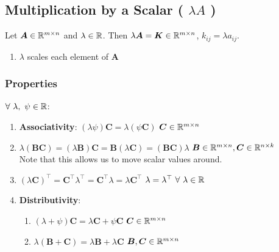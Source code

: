 \subsection{Multiplication by a Scalar ( $\lambda A$ )}

Let $\bm{A} \in \mathbb{R}^{m\times n}$ and $\lambda \in \mathbb{R}$. 
Then $\lambda \bm{A} = \bm{K} \in \mathbb{R}^{m\times n}$, $k_{ij} = \lambda a_{ij}$.
\hfill \cite{mfml/book/mml/Deisenroth-Faisal-Ong}


\begin{enumerate}
    \item $\lambda$ scales each element of $\bm{A}$
    \hfill \cite{mfml/book/mml/Deisenroth-Faisal-Ong}    
\end{enumerate}





\subsubsection{Properties}

$\forall\ \lambda,\ \psi \in \mathbb{R}$:
\vspace{0.2cm}
\begin{enumerate}
    \item \textbf{Associativity}:
    $(\lambda \psi )\bm{C} = \lambda (\psi \bm{C})$ \hfill $\bm{C} \in  \mathbb{R}^{m\times n}$
    \hfill \cite{mfml/book/mml/Deisenroth-Faisal-Ong}
    
    \item $
        \lambda (\bm{BC}) 
        = (\lambda \bm{B})\bm{C} 
        = \bm{B}(\lambda \bm{C}) 
        = (\bm{BC})\lambda 
        $ 
    \hfill $\bm{B} \in  \mathbb{R}^{m\times n}, \bm{C} \in  \mathbb{R}^{n\times k}$
    \hfill \cite{mfml/book/mml/Deisenroth-Faisal-Ong}
    \\
    Note that this allows us to move scalar values around.
    \hfill \cite{mfml/book/mml/Deisenroth-Faisal-Ong}

    \item $
        (\lambda \bm{C}) ^\top  
        = \bm{C}^\top \lambda ^\top  
        = \bm{C}^\top \lambda  
        = \lambda \bm{C}^\top 
    $
    \hfill $\lambda  = \lambda ^\top \  \forall \ \lambda  \in  \mbbR$
    \hfill \cite{mfml/book/mml/Deisenroth-Faisal-Ong}

    \item \textbf{Distributivity}:
    \begin{enumerate}
        \item $(\lambda  + \psi )\bm{C} = \lambda \bm{C} + \psi \bm{C}$
        \hfill $\bm{C} \in  \mathbb{R}^{m\times n}$
        \hfill \cite{mfml/book/mml/Deisenroth-Faisal-Ong}

        \item $\lambda (\bm{B} + \bm{C}) = \lambda \bm{B} + \lambda \bm{C}$
        \hfill $\bm{B}, \bm{C} \in  \mathbb{R}^{m\times n}$
        \hfill \cite{mfml/book/mml/Deisenroth-Faisal-Ong}        
    \end{enumerate}
\end{enumerate}



